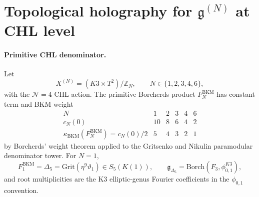 \providecommand{\kBKM}{\kappa_{\mathrm{BKM}}}
\providecommand{\kch}{\kappa_{\mathrm{ch}}}
\providecommand{\kcat}{\kappa_{\mathrm{cat}}}
\providecommand{\kfiber}{\kappa_{\mathrm{fiber}}}
\providecommand{\kHeis}{\kappa_{\mathrm{ch}}^{\mathrm{Heis}}}
\providecommand{\Z}{\mathbb{Z}}
\providecommand{\C}{\mathbb{C}}
\providecommand{\fg}{\mathfrak{g}}
\providecommand{\Mp}{\mathrm{Mp}}
\providecommand{\CY}{\mathrm{CY}}
\providecommand{\SVOA}{\mathrm{SVOA}}
\providecommand{\Phihol}{\Phi^{\mathrm{hol}}}
\providecommand{\Phisup}{\Phi^{\mathrm{sup}}}
\providecommand{\Hhol}{H_{\mathrm{hol}}}
\providecommand{\cAdS}{c^{\mathrm{AdS}}}
\providecommand{\CHLbulk}{\mathrm{CHL}\text{-}\mathrm{bulk}}
\providecommand{\ChirAlg}{\mathrm{ChirAlg}}
\providecommand{\CYN}{X^{(N)}}

\section{Topological holography for \(\fg^{(N)}\) at CHL level}
\label{wn:sec:topological-holographic-AdS3-CHL}

\paragraph{Primitive CHL denominator.}
Let
\[
  \CYN=(K3\times T^2)/\Z_N,\qquad N\in\{1,2,3,4,6\},
\]
with the \(\mathcal N=4\) CHL action. The primitive Borcherds product
\(F_N^{\mathrm{BKM}}\) has constant term and BKM weight
\[
\begin{array}{c|ccccc}
N & 1 & 2 & 3 & 4 & 6\\ \hline
c_N(0) & 10 & 8 & 6 & 4 & 2\\
\kBKM(F_N^{\mathrm{BKM}})=c_N(0)/2 & 5 & 4 & 3 & 2 & 1
\end{array}
\]
by Borcherds' weight theorem applied to the Gritsenko and Nikulin
paramodular denominator tower. For \(N=1\),
\[
  F_1^{\mathrm{BKM}}=\Delta_5
  =\mathrm{Grit}(\eta^9\vartheta_1)\in S_5(K(1)),
  \qquad
  \fg_{\Delta_5}=\mathrm{Borch}(F_3,\phi_{0,1}^{K3}),
\]
and root multiplicities are the K3 elliptic-genus Fourier coefficients
in the \(\phi_{0,1}\) convention.

